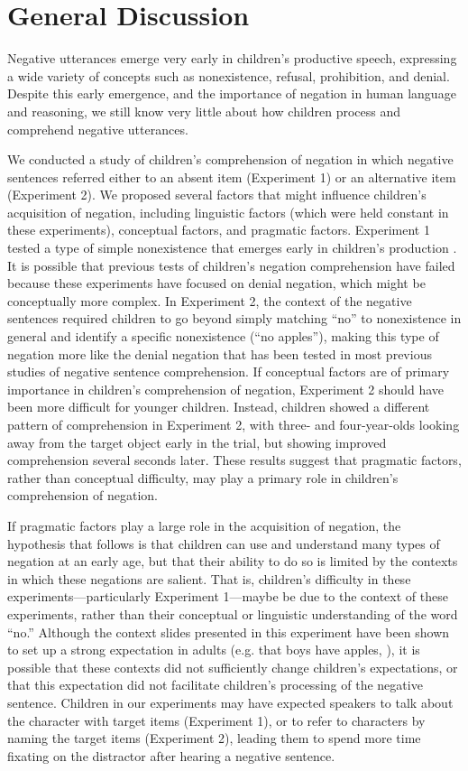\documentclass[man]{apa2}
\begin{document}
\section{General Discussion}

Negative utterances emerge very early in children's productive speech, expressing a wide variety of concepts such as nonexistence, refusal, prohibition, and denial.  Despite this early emergence, and the importance of negation in human language and reasoning, we still know very little about how children process and comprehend negative utterances.  

We conducted a study of children's comprehension of negation in which negative sentences referred either to an absent item (Experiment 1) or an alternative item (Experiment 2).   We proposed several factors that might influence children's acquisition of negation, including linguistic factors (which were held constant in these experiments), conceptual factors, and pragmatic factors.  Experiment 1 tested a type of simple nonexistence that emerges early in children's production \cite{pea1980}.  It is possible that previous tests of children's negation comprehension have failed because these experiments have focused on denial negation, which might be conceptually more complex.  In Experiment 2, the context of the negative sentences required children to go beyond simply matching ``no'' to nonexistence in general and identify a specific nonexistence (``no apples''), making this type of negation more like the denial negation that has been tested in most previous studies of negative sentence comprehension.  If conceptual factors are of primary importance in children's comprehension of negation, Experiment 2 should have been more difficult for younger children.  Instead, children showed a different pattern of comprehension in Experiment 2, with three- and four-year-olds looking away from the target object early in the trial, but showing improved comprehension several seconds later.  These results suggest that pragmatic factors, rather than conceptual difficulty, may play a primary role in children's comprehension of negation.

If pragmatic factors play a large role in the acquisition of negation, the hypothesis that follows is that children can use and understand many types of negation at an early age, but that their ability to do so is limited by the contexts in which these negations are salient.  That is, children's difficulty in these experiments---particularly Experiment 1---maybe be due to the context of these experiments, rather than their conceptual or linguistic understanding of the word ``no.''  Although the context slides presented in this experiment have been shown to set up a strong expectation in adults (e.g. that boys have apples, ), it is possible that these contexts did not sufficiently change children's expectations, or that this expectation did not facilitate children's processing of the negative sentence.  Children in our experiments may have expected speakers to talk about the character with target items (Experiment 1), or to refer to characters by naming the target items (Experiment 2), leading them to spend more time fixating on the distractor after hearing a negative sentence.
\end{document}
